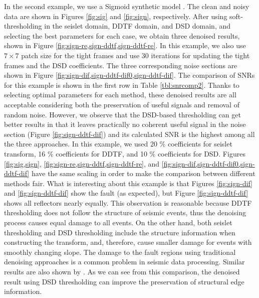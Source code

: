In the second example, we use a Sigmoid synthetic model \cite[]{claerbout2010bei}. The clean and noisy data are shown in Figures \ref{fig:sig} and \ref{fig:sign}, respectively. After using soft-thresholding in the seislet domain, DDTF domain, and DSD domain, and selecting the best parameters for each case, we obtain three denoised results, shown in Figure \ref{fig:sign-re,sign-ddtf,sign-ddtf-re}. In this example, we also use $7\times7$ patch size for the tight frames and use 30 iterations for updating the tight frames and the DSD coefficients. The three corresponding noise sections are shown in Figure \ref{fig:sign-dif,sign-ddtf-dif0,sign-ddtf-dif}. The comparison of SNRs for this example is shown in the first row in Table \ref{tbl:snrcomp2}. Thanks to selecting optimal parameters for each method, these denoised results are all acceptable considering both the preservation of useful signals and removal of random noise. However, we observe that the DSD-based thresholding can get better results in that it leaves practically no coherent useful signal in the noise section (Figure \ref{fig:sign-ddtf-dif}) and its calculated SNR is the highest among all the three approaches. In this example, we used 20 \% coefficients for seislet transform, 16 \% coefficients for DDTF, and 10 \% coefficients for DSD. Figures \ref{fig:sig,sign}, \ref{fig:sign-re,sign-ddtf,sign-ddtf-re}, and \ref{fig:sign-dif,sign-ddtf-dif0,sign-ddtf-dif} have the same scaling in order to make the comparison between different methods fair.  What is interesting about this example is that Figures \ref{fig:sign-dif} and \ref{fig:sign-ddtf-dif} show the fault (as expected), but Figure \ref{fig:sign-ddtf-dif} shows all reflectors nearly equally. This observation is reasonable because DDTF thresholding does not follow the structure of seismic events, thus the denoising process causes equal damage to all events. On the other hand, both seislet thresholding and DSD thresholding include the structure information when constructing the transform, and, therefore, cause smaller damage for events with smoothly changing slope. The damage to the fault regions using traditional denoising approaches is a common problem in seismic data processing. Similar results are also shown by \cite{liuyang2010}. As we can see from this comparison, the denoised result using DSD thresholding can improve the preservation of structural edge information.



